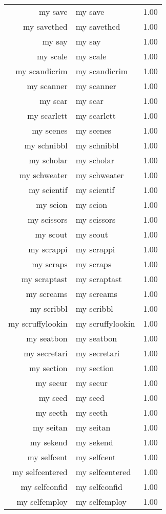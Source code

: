 \begin{table}[ht]
\begin{tabular}{rlr}
  my save & my save & 1.00 \\ 
  my savethed & my savethed & 1.00 \\ 
  my say & my say & 1.00 \\ 
  my scale & my scale & 1.00 \\ 
  my scandicrim & my scandicrim & 1.00 \\ 
  my scanner & my scanner & 1.00 \\ 
  my scar & my scar & 1.00 \\ 
  my scarlett & my scarlett & 1.00 \\ 
  my scenes & my scenes & 1.00 \\ 
  my schnibbl & my schnibbl & 1.00 \\ 
  my scholar & my scholar & 1.00 \\ 
  my schweater & my schweater & 1.00 \\ 
  my scientif & my scientif & 1.00 \\ 
  my scion & my scion & 1.00 \\ 
  my scissors & my scissors & 1.00 \\ 
  my scout & my scout & 1.00 \\ 
  my scrappi & my scrappi & 1.00 \\ 
  my scraps & my scraps & 1.00 \\ 
  my scraptast & my scraptast & 1.00 \\ 
  my screams & my screams & 1.00 \\ 
  my scribbl & my scribbl & 1.00 \\ 
  my scruffylookin & my scruffylookin & 1.00 \\ 
  my seatbon & my seatbon & 1.00 \\ 
  my secretari & my secretari & 1.00 \\ 
  my section & my section & 1.00 \\ 
  my secur & my secur & 1.00 \\ 
  my seed & my seed & 1.00 \\ 
  my seeth & my seeth & 1.00 \\ 
  my seitan & my seitan & 1.00 \\ 
  my sekend & my sekend & 1.00 \\ 
  my selfcent & my selfcent & 1.00 \\ 
  my selfcentered & my selfcentered & 1.00 \\ 
  my selfconfid & my selfconfid & 1.00 \\ 
  my selfemploy & my selfemploy & 1.00 \\ 

\end{tabular}
\end{table}
